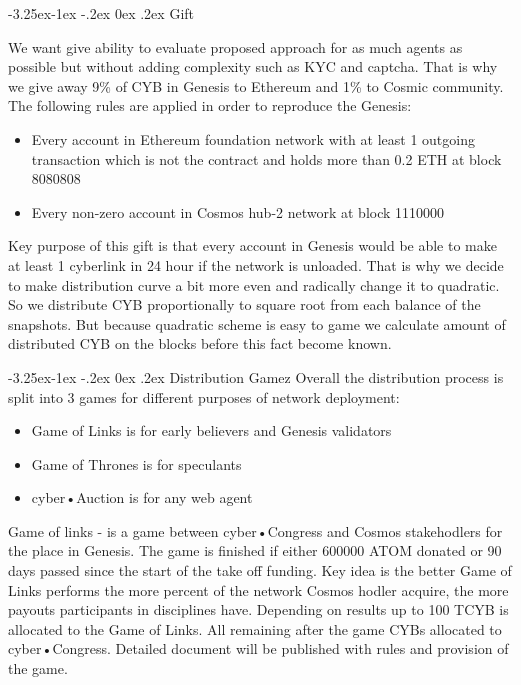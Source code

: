 \documentclass[8pt,oneside]{amsart}
\makeatletter
\renewcommand\subsection{\@startsection{subsection}{2}{\z@}%
                                     {-3.25ex\@plus -1ex \@minus -.2ex}%
                                     {0ex \@plus .2ex}%
                                     {\play\Large}}%
\newcommand{\titleSection}[1]{\subsection{#1}}
\makeatother
\begin{document}
\titleSection{Gift}\label{gift}

We want give ability to evaluate proposed approach for as much agents as possible but without adding complexity such as KYC and captcha. That is why we give away 9\% of CYB in Genesis to Ethereum and 1\% to Cosmic community. The following rules are applied in order to reproduce the Genesis:
\begin{itemize}
\item Every account in Ethereum foundation network with at least 1 outgoing transaction which is not the contract and holds more than 0.2 ETH at block 8080808
\item Every non-zero account in Cosmos hub-2 network at block 1110000
\end{itemize}

Key purpose of this gift is that every account in Genesis would be able to make at least 1 cyberlink in 24 hour if the network is unloaded. That is why we decide to make distribution curve a bit more even and radically change it to quadratic. So we distribute CYB proportionally to square root from each balance of the snapshots. But because quadratic scheme is easy to game we calculate amount of distributed CYB on the blocks before this fact become known.

\titleSection{Distribution Gamez}\label{gamez}
Overall the distribution process is split into 3 games for different purposes of network deployment:
\begin{itemize}
\item Game of Links is for early believers and Genesis validators
\item Game of Thrones is for speculants
\item cyber•Auction is for any web agent
\end{itemize}

Game of links - is a game between cyber•Congress and Cosmos stakehodlers for the place in Genesis. The game is finished if either 600000 ATOM donated or 90 days passed since the start of the take off funding. Key idea is the better Game of Links performs the more percent of the network Cosmos hodler acquire, the more payouts participants in disciplines have. Depending on results up to 100 TCYB is allocated to the Game of Links. All remaining after the game CYBs allocated to cyber•Congress. Detailed document will be published with rules and provision of the game.
\end{document}
